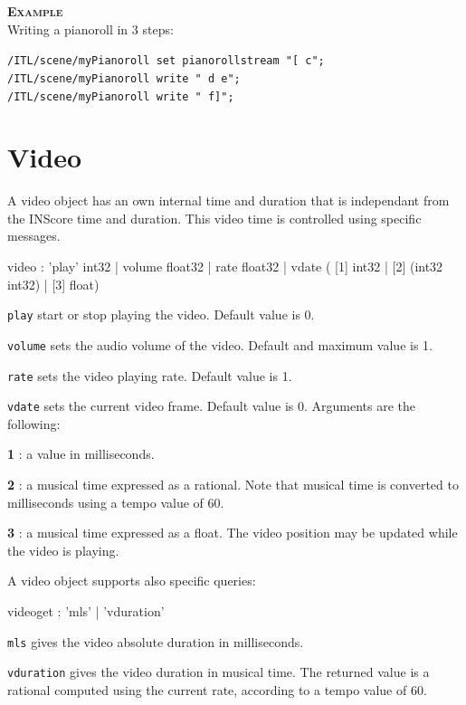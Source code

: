 \documentclass[a4paper,twoside]{report}
\newcommand{\sublevel}[1]	{\section{#1}}
\newcommand{\OSC}[1]		{\texttt{#1}}
\newcommand{\example}		{\textbf{\hspace{-1.5cm}\textbf{\textsc{Example }}}}
\let\olditemize\itemize
\let\oldenditemize\enditemize
\renewenvironment{itemize} 	{\olditemize \setlength{\itemsep}{1mm}}{\oldenditemize}
\newcommand{\sample}	[1]			{\vspace{-2mm}\begin{center}\colorbox{mygrey}{
								\begin{minipage}[t]{0.9\columnwidth} 
								{\small \texttt{#1}}
								\end{minipage}}\end{center}}
\begin{document}
\example \\
Writing a pianoroll in 3 steps:
\sample{/ITL/scene/myPianoroll set pianorollstream "[ c"; \\
/ITL/scene/myPianoroll write " d e";\\
/ITL/scene/myPianoroll write " f]";
}

\sublevel{Video}
\label{video}

A video object has an own internal time and duration that is independant from the INScore time and duration. 
This video time is controlled using specific messages.

\begin{rail}
video :	'play' int32
		| volume float32
		| rate   float32
		| vdate  ( [1] int32 | [2] (int32 int32) | [3] float)
\end{rail}

\begin{itemize}
\item \OSC{play} start or stop playing the video. Default value is 0. 
\item \OSC{volume} sets the audio volume of the video. Default and maximum value is 1.
\item \OSC{rate} sets the video playing rate. Default value is 1.
\item \OSC{vdate} sets the current video frame. Default value is 0. Arguments are the following:
\begin{itemize}
\item \textbf{1} : a value in milliseconds. 
\item \textbf{2} : a musical time expressed as a rational. Note that musical time is converted to milliseconds using a tempo value of 60. 
\item \textbf{3} : a musical time expressed as a float. 
\end{itemize}
The video position may be updated while the video is playing.
\end{itemize}

A video object supports also specific queries: 
\begin{rail}
videoget :	'mls'
			| 'vduration'
\end{rail}

\begin{itemize}
\item \OSC{mls} gives the video absolute duration in milliseconds.
\item \OSC{vduration} gives the video duration in musical time. The returned value is a rational computed using the current rate, according to a tempo value of 60.
\end{itemize}
\end{document}
